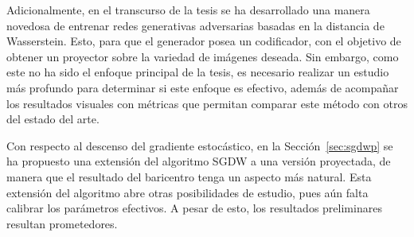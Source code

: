 Adicionalmente, en el transcurso de la tesis se ha desarrollado una manera novedosa de entrenar redes generativas adversarias basadas en la distancia de Wasserstein. Esto, para que el generador posea un codificador, con el objetivo de obtener un proyector sobre la variedad de imágenes deseada. Sin embargo, como este no ha sido el enfoque principal de la tesis, es necesario realizar un estudio más profundo para determinar si este enfoque es efectivo, además de acompañar los resultados visuales con métricas que permitan comparar este método con otros del estado del arte.

Con respecto al descenso del gradiente estocástico, en la Sección~\ref{sec:sgdwp} se ha propuesto una extensión del algoritmo SGDW a una versión proyectada, de manera que el resultado del baricentro tenga un aspecto más natural. Esta extensión del algoritmo abre otras posibilidades de estudio, pues aún falta calibrar los parámetros efectivos. A pesar de esto, los resultados preliminares resultan prometedores.



